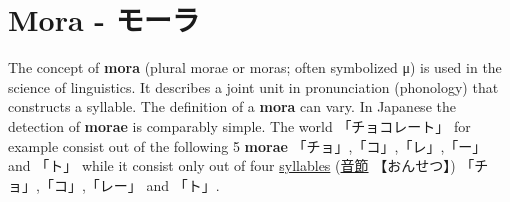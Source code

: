 \section{Mora - モーラ} \label{sec:Mora}

The concept of \textbf{mora}  (plural morae or moras; often symbolized μ) is
used in the science of linguistics. It describes a joint unit in pronunciation
(phonology) that constructs a syllable. The definition of a \textbf{mora} can
vary.  In Japanese the detection of \textbf{morae} is comparably simple. The
world {「チョコレート」} for example consist out of the following 5
\textbf{morae} {「チョ」},{「コ」},{「レ」},{「ー」} and {「ト」} while it
consist only out of four \hyperref[sec:Syllable]{syllables}
{(\hyperref[sec:Syllable]{音節} 【おんせつ】)} {「チョ」},{「コ」},{「レー」}
and {「ト」}.

